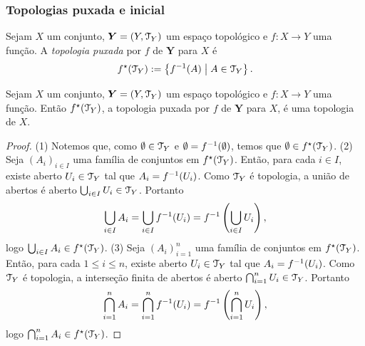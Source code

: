 \subsubsection{Topologias puxada e inicial}

\begin{definition}
Sejam $X$ um conjunto, $\bm Y = (Y,\mathcal{T}_Y)$ um espaço topológico e $f: X \to Y$ uma função. A \emph{topologia puxada} por $f$ de $\bm Y$ para $X$ é
	\begin{equation*}
	f^\star(\mathcal{T}_Y) := \left\{{f^{-1}(A)}\;\middle\vert\;{A \in \mathcal{T}_Y}\right\}.
	\end{equation*}
\end{definition}

\begin{proposition}
Sejam $X$ um conjunto, $\bm Y = (Y,\mathcal{T}_Y)$ um espaço topológico e $f: X \to Y$ uma função. Então $f^\star(\mathcal{T}_Y)$, a topologia puxada por $f$ de $\bm Y$ para $X$, é uma topologia de $X$.
\end{proposition}
\begin{proof}
(1) Notemos que, como $\emptyset \in \mathcal{T}_Y$ e $\emptyset = f^{-1}(\emptyset)$, temos que $\emptyset \in f^\star(\mathcal{T}_Y)$. (2) Seja $(A_i)_{i \in I}$ uma família de conjuntos em $f^\star(\mathcal{T}_Y)$. Então, para cada $i \in I$, existe aberto $U_i \in \mathcal{T}_Y$ tal que $A_i=f^{-1}(U_i)$. Como $\mathcal{T}_Y$ é topologia, a união de abertos é aberto $\bigcup_{i \in I} U_i \in \mathcal{T}_Y$. Portanto
	\begin{equation*}
	\bigcup_{i \in I} A_i = \bigcup_{i \in I} f^{-1}(U_i) = f^{-1}\left( \bigcup_{i \in I} U_i\right),
	\end{equation*}
logo $\bigcup_{i \in I} A_i \in f^\star(\mathcal{T}_Y)$.
(3) Seja $(A_i)_{i=1}^n$ uma família de conjuntos em $f^\star(\mathcal{T}_Y)$. Então, para cada $1 \leq i \leq n$, existe aberto $U_i \in \mathcal{T}_Y$ tal que $A_i=f^{-1}(U_i)$. Como $\mathcal{T}_Y$ é topologia, a interseção finita de abertos é aberto $\bigcap_{i=1}^n U_i \in \mathcal{T}_Y$. Portanto
	\begin{equation*}
	\bigcap_{i=1}^n A_i = \bigcap_{i=1}^n f^{-1}(U_i) = f^{-1}\left( \bigcap_{i=1}^n U_i\right),
	\end{equation*}
logo $\bigcap_{i=1}^n A_i \in f^\star(\mathcal{T}_Y)$.
\end{proof}

